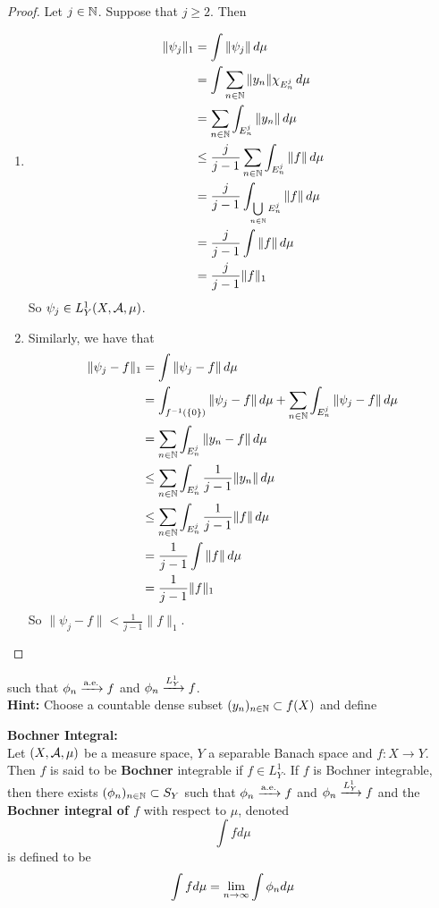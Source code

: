 \documentclass{book}
\begin{document}
	\begin{proof}	
	Let $j \in \mathbb{N}$. 
	Suppose that $j \geq 2$. Then 
	\begin{enumerate}
		\item \begin{align*}
			\|\psi_j\|_1 
			& = \int \|\psi_j\| \, d \mu \\
			& = \int \sum\limits_{n \in \mathbb{N}} \|y_n\| \chi_{E_n^j} \, d \mu \\
			& =  \sum\limits_{n \in \mathbb{N}} \int_{E_n^j} \|y_n\| \, d \mu \\
			& \leq \frac{j}{j-1} \sum\limits_{n \in \mathbb{N}} \int_{E_n^j} \|f\| \, d \mu \\
			& = \frac{j}{j-1} \int_{\bigcup\limits_{n \in \mathbb{N}} E_n^j} \|f\| \, d \mu \\
			& = \frac{j}{j-1} \int \|f\| \, d \mu \\
			& = \frac{j}{j-1} \|f\|_1
		\end{align*}
		So $\psi_j \in L^1_Y(X, \mathcal{A}, \mu)$. 
		\item Similarly, we have that
		\begin{align*}
			\|\psi_j - f\|_1 
			& = \int \|\psi_j - f\| \, d \mu \\
			& = \int_{f^{-1}(\{0\})} \|\psi_j - f\| \, d \mu +  \sum\limits_{n \in \mathbb{N}} \int_{E_n^j} \|\psi_j - f\| \, d \mu \\
			& = \sum\limits_{n \in \mathbb{N}} \int_{E_n^j} \|y_n - f\| \, d \mu \\
			& \leq  \sum\limits_{n \in \mathbb{N}} \int_{E_n^j}  \frac{1}{j - 1} \|y_n\| \, d \mu \\
			& \leq  \sum\limits_{n \in \mathbb{N}} \int_{E_n^j}  \frac{1}{j - 1} \|f\| \, d \mu \\
			& =  \frac{1}{j - 1} \int \|f\| \, d \mu \\
			& =  \frac{1}{j - 1} \|f\|_1
		\end{align*}
		So $\|\psi_j - f\| < \frac{1}{j - 1} \|f\|_1$.
	\end{enumerate}
	\end{proof}	

	\begin{ex}
		such that $\phi_n \xrightarrow{\text{a.e.}} f$ and $\phi_n \xrightarrow{L_Y^1} f$.\\
		\textbf{Hint:} Choose a countable dense subset $(y_n)_{n \in \mathbb{N}} \subset f(X)$ and define 
	\end{ex}	
	
	\begin{defn}  \textbf{Bochner Integral:}\\
	Let $(X, \mathcal{A}, \mu)$ be a measure space, $Y$ a separable Banach space and $f:X \rightarrow Y$. Then $f$ is said to be \textbf{Bochner} integrable if $f \in L^1_Y$. If $f$ is Bochner integrable, then there exists $(\phi_n)_{n \in \mathbb{N}} \subset S_Y$ such that $\phi_n \xrightarrow{\text{a.e.}} f$ and $\phi_n \xrightarrow{L_Y^1} f$ and the \textbf{Bochner integral of $f$} with respect to $\mu$, denoted $$\int f d\mu$$ is defined to be $$\int f d\mu = \lim \limits_{n \rightarrow \infty} \int \phi_n d\mu$$ 
	\end{defn}
	
\end{document}
